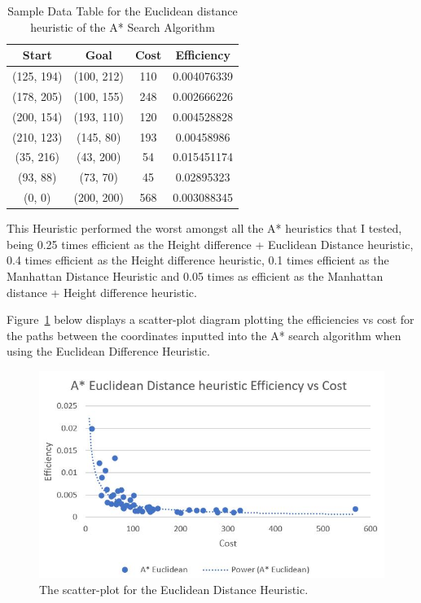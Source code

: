 \documentclass[11pt,oneside]{article}
\begin{document}
\begin{table}[H]
    \centering
    \begin{tabular}{|c|c|c|c|}
        Start        & Goal       & Cost & Efficiency \\ \hline
        (125, 194)   & (100, 212) & 110 & 0.004076339 \\
        (178, 205)   & (100, 155) & 248 & 0.002666226 \\
        (200, 154)   & (193, 110) & 120 & 0.004528828 \\
        (210, 123)   & (145, 80)  & 193 & 0.00458986 \\
        (35, 216)    & (43, 200)  & 54 & 0.015451174 \\
        (93, 88)     & (73, 70)   & 45 & 0.02895323 \\
        (0, 0)       & (200, 200) & 568 & 0.003088345 \\
    \end{tabular}
    \caption{Sample Data Table for the Euclidean distance heuristic of the A* Search Algorithm}
    \label{tab:my_label}
\end{table}

This Heuristic performed the worst amongst all the A* heuristics that I tested, being 0.25 times efficient as the Height difference + Euclidean Distance heuristic, 0.4 times efficient as the Height difference heuristic, 0.1  times efficient as the Manhattan Distance Heuristic and 0.05 times as efficient as the Manhattan distance + Height difference heuristic. 

Figure~\ref{fig:EDEvC} below displays a scatter-plot diagram plotting the efficiencies vs cost for the paths between the coordinates inputted into the A* search algorithm when using the Euclidean Difference Heuristic.

\begin{figure}[H]
    \centering
      \includegraphics[scale=0.8]{ED efficiency vs cost.JPG}
      \caption{The scatter-plot for the Euclidean Distance Heuristic.}
      \label{fig:EDEvC}
    \end{figure} 
\end{document}
